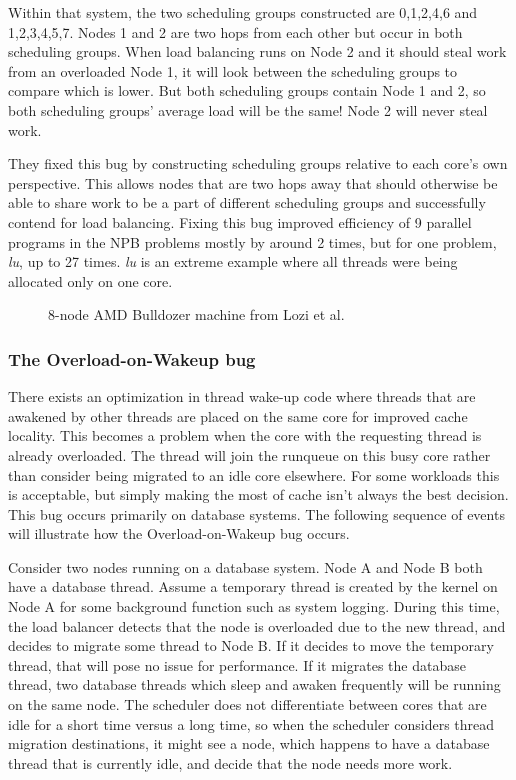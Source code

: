 \documentclass{sig-alternate}
\begin{document}
Within that system, the two scheduling groups constructed are {0,1,2,4,6} and {1,2,3,4,5,7}. Nodes 1 and 2 are two hops from each other but occur in both scheduling groups. When load balancing runs on Node 2 and it should steal work from an overloaded Node 1, it will look between the scheduling groups to compare which is lower. But both scheduling groups contain Node 1 and 2, so both scheduling groups' average load will be the same! Node 2 will never steal work.~\cite{Lozi:2016}

They fixed this bug by constructing scheduling groups relative to each core's own perspective. This allows nodes that are two hops away that should otherwise be able to share work to be a part of different scheduling groups and successfully contend for load balancing. Fixing this bug improved efficiency of 9 parallel programs in the NPB problems mostly by around 2 times, but for one problem, \textit{lu}, up to 27 times. \textit{lu} is an extreme example where all threads were being allocated only on one core.~\cite{Lozi:2016}

\begin{figure}
\centering
{}
\caption{8-node AMD Bulldozer machine from Lozi et al.~\cite{Lozi:2016}}
\label{fig:cfs_schedgroups}
\end{figure}

\subsubsection{The Overload-on-Wakeup bug}
\label{sec:cfsfault_overload}


There exists an optimization in thread wake-up code where threads that are awakened by other threads are placed on the same core for improved cache locality. This becomes a problem when the core with the requesting thread is already overloaded. The thread will join the runqueue on this busy core rather than consider being migrated to an idle core elsewhere. For some workloads this is acceptable, but simply making the most of cache isn't always the best decision. This bug occurs primarily on database systems. The following sequence of events will illustrate how the Overload-on-Wakeup bug occurs.~\cite{Lozi:2016}

Consider two nodes running on a database system. Node A and Node B both have a database thread. Assume a temporary thread is created by the kernel on Node A for some background function such as system logging. During this time, the load balancer detects that the node is overloaded due to the new thread, and decides to migrate some thread to Node B. If it decides to move the temporary thread, that will pose no issue for performance. If it migrates the database thread, two database threads which sleep and awaken frequently will be running on the same node. The scheduler does not differentiate between cores that are idle for a short time versus a long time, so when the scheduler considers thread migration destinations, it might see a node, which happens to have a database thread that is currently idle, and decide that the node needs more work.~\cite{Lozi:2016}
\end{document}
